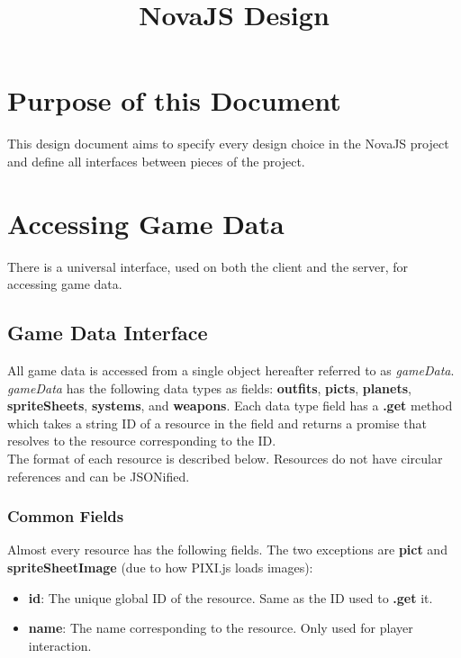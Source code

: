 \documentclass{article}
\title{NovaJS Design}
\newcommand{\gameData}{\emph{gameData}\xspace}
\begin{document}
\maketitle

\section{Purpose of this Document}
This design document aims to specify every design choice in the NovaJS project and define all interfaces between pieces of the project.

\section{Accessing Game Data}

There is a universal interface, used on both the client and the server, for accessing game data.
\subsection{Game Data Interface}

All game data is accessed from a single object hereafter referred to as \gameData. \gameData has the following data types as fields: \textbf{outfits}, \textbf{picts}, \textbf{planets}, \textbf{spriteSheets}, \textbf{systems}, and \textbf{weapons}. Each data type field has a \textbf{.get} method which takes a string ID of a resource in the field and returns a promise that resolves to the resource corresponding to the ID.\\

The format of each resource is described below. Resources do not have circular references and can be JSONified.
\subsubsection{Common Fields}
Almost every resource has the following fields. The two exceptions are \textbf{pict} and \textbf{spriteSheetImage} (due to how PIXI.js loads images):
\begin{itemize}
\item{\textbf{id}}: The unique global ID of the resource. Same as the ID used to \textbf{.get} it.
\item{\textbf{name}}: The name corresponding to the resource. Only used for player interaction.

\end{itemize}
\end{document}
